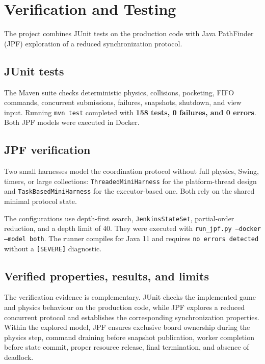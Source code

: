 \clearpage
\section{Verification and Testing}

The project combines JUnit tests on the production code with Java PathFinder
(JPF) exploration of a reduced synchronization protocol.

\subsection{JUnit tests}

The Maven suite checks deterministic physics, collisions, pocketing, FIFO
commands, concurrent submissions, failures, snapshots, shutdown, and view
input. Running \texttt{mvn test} completed with \textbf{158 tests, 0 failures,
and 0 errors}. Both JPF models were executed in Docker.

\subsection{JPF verification}

Two small harnesses model the coordination protocol without full physics,
Swing, timers, or large collections:
\texttt{ThreadedMiniHarness} for the platform-thread design and
\texttt{TaskBasedMiniHarness} for the executor-based one. Both rely on the
shared minimal protocol state.

The configurations use depth-first search, \texttt{JenkinsStateSet},
partial-order reduction, and a depth limit of 40. They were executed with
\texttt{run\_jpf.py --docker --model both}. The runner compiles for Java 11 and
requires \texttt{no errors detected} without a \texttt{[SEVERE]} diagnostic.

\subsection{Verified properties, results, and limits}

The verification evidence is complementary. JUnit checks the implemented game
and physics behaviour on the production code, while JPF explores a reduced
concurrent protocol and establishes the corresponding synchronization
properties. Within the explored model, JPF ensures exclusive board ownership
during the physics step, command draining before snapshot publication, worker
completion before state commit, proper resource release, final termination, and
absence of deadlock.

